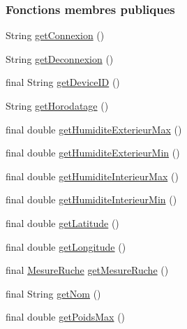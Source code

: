 \subsubsection*{Fonctions membres publiques}
\begin{DoxyCompactItemize}
\item 
String \hyperlink{classcom_1_1example_1_1bee__honeyt_1_1_ruche_abe485f3c2af62e324ffed32bb84c796f}{get\+Connexion} ()
\item 
String \hyperlink{classcom_1_1example_1_1bee__honeyt_1_1_ruche_a57fc0d510a3e9594e24b6586fcbea9ef}{get\+Deconnexion} ()
\item 
final String \hyperlink{classcom_1_1example_1_1bee__honeyt_1_1_ruche_a4960ba8542f507c850978b939b9aa9e5}{get\+Device\+ID} ()
\item 
String \hyperlink{classcom_1_1example_1_1bee__honeyt_1_1_ruche_a864e48de51e9b0e8e5c78ed7fe58a2d9}{get\+Horodatage} ()
\item 
final double \hyperlink{classcom_1_1example_1_1bee__honeyt_1_1_ruche_ae489d121777412762533465498d1e60c}{get\+Humidite\+Exterieur\+Max} ()
\item 
final double \hyperlink{classcom_1_1example_1_1bee__honeyt_1_1_ruche_a53c9d56abd4eed6f2f2d413e78ab0aba}{get\+Humidite\+Exterieur\+Min} ()
\item 
final double \hyperlink{classcom_1_1example_1_1bee__honeyt_1_1_ruche_a80f34bd8fdc880a8f94d9d61b6b70c78}{get\+Humidite\+Interieur\+Max} ()
\item 
final double \hyperlink{classcom_1_1example_1_1bee__honeyt_1_1_ruche_a4885004ef2c40754789156d83e600b13}{get\+Humidite\+Interieur\+Min} ()
\item 
final double \hyperlink{classcom_1_1example_1_1bee__honeyt_1_1_ruche_a1e291ebb5c69c90fa5b6b7fafe09820e}{get\+Latitude} ()
\item 
final double \hyperlink{classcom_1_1example_1_1bee__honeyt_1_1_ruche_a8a460b9473646a05668426a57e9773cb}{get\+Longitude} ()
\item 
final \hyperlink{classcom_1_1example_1_1bee__honeyt_1_1_mesure_ruche}{Mesure\+Ruche} \hyperlink{classcom_1_1example_1_1bee__honeyt_1_1_ruche_afab94785f8af31f6ce436394ab41c9f3}{get\+Mesure\+Ruche} ()
\item 
final String \hyperlink{classcom_1_1example_1_1bee__honeyt_1_1_ruche_a940047f0b4b8218e7faa7eafcc9665b2}{get\+Nom} ()
\item 
final double \hyperlink{classcom_1_1example_1_1bee__honeyt_1_1_ruche_a713d2985a0a10983ad16d510decf46a3}{get\+Poids\+Max} ()
\item 

\end{DoxyCompactItemize}
